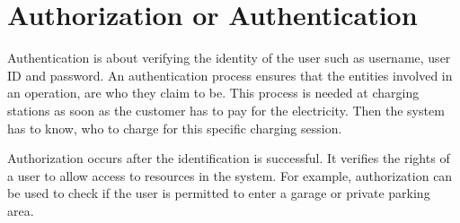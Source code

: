 \section{Authorization or Authentication}

Authentication is about verifying the identity of the user such as username, user ID and password. An authentication process ensures that the entities involved in an operation, are who they claim to be. This process is needed at charging stations as soon as the customer has to pay for the electricity. Then the system has to know, who to charge for this specific charging session.

Authorization occurs after the identification is successful. It verifies the rights of a user to allow access to resources in the system. For example, authorization can be used to check if the user is permitted to enter a garage or private parking area.
\cite{Auth}


\clearpage
\pagebreak